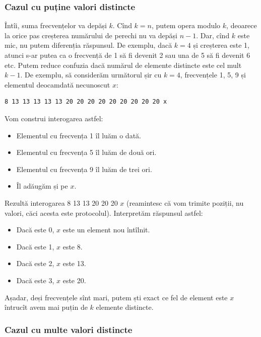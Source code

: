 \documentclass[../main.tex]{subfiles}
\begin{document}
\subsubsection*{Cazul cu puține valori distincte}

Întîi, suma frecvențelor va depăși $k$. Cînd $k=n$, putem opera modulo $k$, deoarece la orice pas creșterea numărului de perechi nu va depăși $n-1$. Dar, cînd $k$ este mic, nu putem diferenția răspunsul. De exemplu, dacă $k=4$ și creșterea este 1, atunci s-ar putea ca o frecvență de 1 să fi devenit 2 sau una de 5 să fi devenit 6 etc. Putem reduce confuzia dacă numărul de elemente distincte este cel mult $k-1$. De exemplu, să considerăm următorul șir cu $k=4$, frecvențele 1, 5, 9 și elementul deocamdată necunoscut $x$:

\begin{verbatim}
8 13 13 13 13 13 20 20 20 20 20 20 20 20 20 x
\end{verbatim}

Vom construi interogarea astfel:

\begin{itemize}
  \item Elementul cu frecvența 1 îl luăm o dată.
  \item Elementul cu frecvența 5 îl luăm de două ori.
  \item Elementul cu frecvența 9 îl luăm de trei ori.
  \item Îl adăugăm și pe $x$.
\end{itemize}

Rezultă interogarea 8 13 13 20 20 20 $x$ (reamintesc că vom trimite poziții, nu valori, căci acesta este protocolul). Interpretăm răspunsul astfel:

\begin{itemize}
  \item Dacă este 0, $x$ este un element nou întîlnit.
  \item Dacă este 1, $x$ este 8.
  \item Dacă este 2, $x$ este 13.
  \item Dacă este 3, $x$ este 20.
\end{itemize}

Așadar, deși frecvențele sînt mari, putem ști exact ce fel de element este $x$ întrucît avem mai puțin de $k$ elemente distincte.

\subsubsection*{Cazul cu multe valori distincte}
\end{document}
